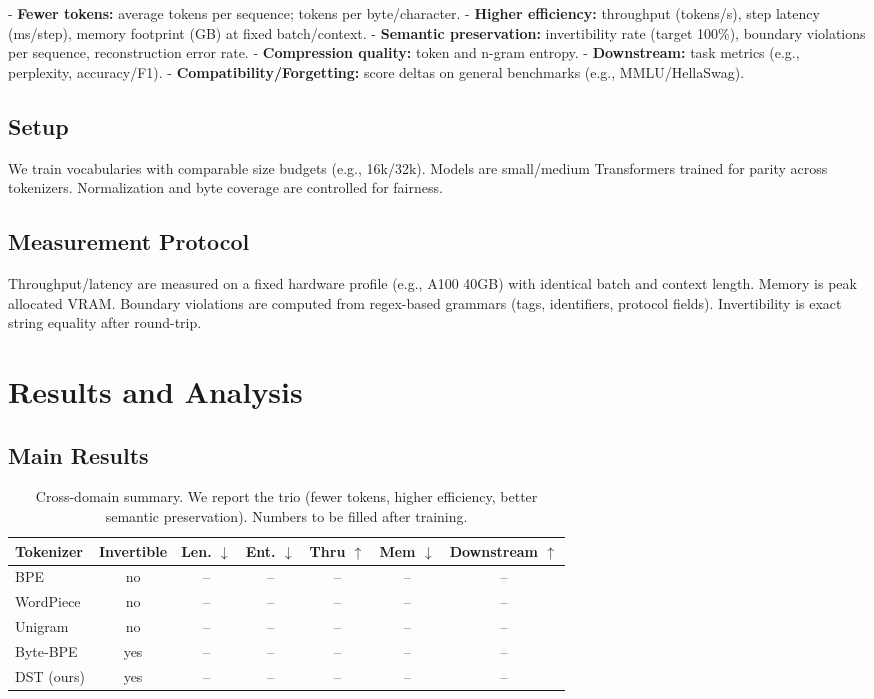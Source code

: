 - \textbf{Fewer tokens:} average tokens per sequence; tokens per byte/character.
- \textbf{Higher efficiency:} throughput (tokens/s), step latency (ms/step), memory footprint (GB) at fixed batch/context.
- \textbf{Semantic preservation:} invertibility rate (target 100\%), boundary violations per sequence, reconstruction error rate.
- \textbf{Compression quality:} token and n-gram entropy.
- \textbf{Downstream:} task metrics (e.g., perplexity, accuracy/F1).
- \textbf{Compatibility/Forgetting:} score deltas on general benchmarks (e.g., MMLU/HellaSwag).

\subsection{Setup}

We train vocabularies with comparable size budgets (e.g., 16k/32k). Models are small/medium Transformers trained for parity across tokenizers. Normalization and byte coverage are controlled for fairness.

\subsection{Measurement Protocol}

Throughput/latency are measured on a fixed hardware profile (e.g., A100 40GB) with identical batch and context length. Memory is peak allocated VRAM. Boundary violations are computed from regex-based grammars (tags, identifiers, protocol fields). Invertibility is exact string equality after round-trip.

\section{Results and Analysis}
\label{sec:results}

\subsection{Main Results}

\begin{table}[h]
  \centering
  \small
  \begin{tabular}{lcccccc}
    \toprule
    Tokenizer & Invertible & Len. $\downarrow$ & Ent. $\downarrow$ & Thru $\uparrow$ & Mem $\downarrow$ & Downstream $\uparrow$ \\
    \midrule
    BPE &  \;no &  -- & -- & -- & -- & -- \\
    WordPiece & \;no & -- & -- & -- & -- & -- \\
    Unigram & \;no & -- & -- & -- & -- & -- \\
    Byte‑BPE &  yes & -- & -- & -- & -- & -- \\
    DST (ours) &  yes & -- & -- & -- & -- & -- \\
    \bottomrule
  \end{tabular}
  \caption{Cross-domain summary. We report the trio (fewer tokens, higher efficiency, better semantic preservation). Numbers to be filled after training.}
  \label{tab:main}
\end{table}

